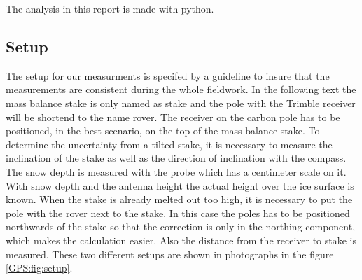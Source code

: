 The analysis in this report is made with python.

\subsection{Setup} \label{GPS:subsec:setup}


The setup for our measurments is specifed by a guideline to insure that the measurements are consistent during the whole fieldwork.
In the following text the mass balance stake is only named as stake and the pole with the Trimble receiver will be shortend to the name rover.
The receiver on the carbon pole has to be positioned, in the best scenario, on the top of the mass balance stake.
To determine the uncertainty from a tilted stake, it is necessary to measure the inclination of the stake as well as the direction of inclination with the compass.
The snow depth is measured with the probe which has a centimeter scale on it.
With snow depth and the antenna height the actual height over the ice surface is known. 
When the stake is already melted out too high, it is necessary to put the pole with the rover next to the stake. 
In this case the poles has to be positioned northwards of the stake so that the correction is only in the northing component, which makes the calculation easier. 
Also the distance from the receiver to stake is measured.
These two different setups are shown in photographs in the figure \ref{GPS:fig:setup}.

